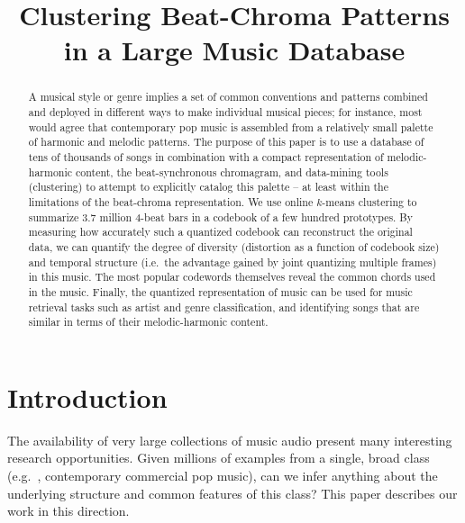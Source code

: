 \documentclass{article}
\title{Clustering Beat-Chroma Patterns in a Large Music Database}
\newcommand{\ie}{i.e.~}
\newcommand{\eg}{e.g.~}
\begin{document}
%
\maketitle
%
\begin{abstract}
A musical style or genre implies a set of common conventions
and patterns combined and deployed in different ways to make
individual musical pieces; for instance, most would agree that
contemporary pop music is assembled from a relatively small
palette of harmonic and melodic patterns.  The purpose of this
paper is to use a database of tens of thousands of songs
in combination with a compact representation of melodic-harmonic
content, the beat-synchronous chromagram, and data-mining
tools (clustering) to attempt to explicitly catalog this palette --
at least within the limitations of the beat-chroma representation.
We use online $k$-means clustering to summarize 3.7 million
4-beat bars in a codebook of a few hundred prototypes.
By measuring how accurately such a quantized codebook
can reconstruct the original data, we can quantify the degree
of diversity (distortion as a function of codebook size) and
temporal structure (\ie the advantage gained
by joint quantizing multiple frames) in this music.  The most
popular codewords themselves reveal the common chords
used in the music.  Finally, the quantized representation of
music can be used for music retrieval tasks such as artist
and genre classification, and identifying songs that are
similar in terms of their melodic-harmonic content.
\end{abstract}
%
\section{Introduction}\label{sec:introduction}
The availability of very large collections of music audio present
many interesting research opportunities.  Given millions of examples
from a single, broad class (\eg, contemporary commercial pop music),
can we infer anything about the underlying structure and common
features of this class?  This paper describes our work in this direction.
\end{document}
